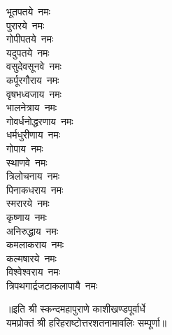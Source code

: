 \begin{multicols}{2}
\begin{flushleft}
भूतपतये~नमः\\
पुरारये~नमः\\
गोपीपतये~नमः\hfill{}\\
यदुपतये~नमः\\
वसुदेवसूनवे~नमः\\
कर्पूरगौराय~नमः\\
वृषभध्वजाय~नमः\\
भालनेत्राय~नमः\\
गोवर्धनोद्धरणाय~नमः\\
धर्मधुरीणाय~नमः\\
गोपाय~नमः\\
स्थाणवे~नमः\\
त्रिलोचनाय~नमः\hfill{}\\
पिनाकधराय~नमः\\
स्मरारये~नमः\\
कृष्णाय~नमः\\
अनिरुद्धाय~नमः\\
कमलाकराय~नमः\\
कल्मषारये~नमः\\
विश्वेश्वराय~नमः\\
त्रिपथगार्द्रजटाकलापायै~नमः\\
\end{flushleft}
\end{multicols}
॥इति श्री स्कन्दमहापुराणे काशीखण्डपूर्वार्धे\\यमप्रोक्तं श्री हरिहराष्टोत्तरशतनामावलिः सम्पूर्णा॥
